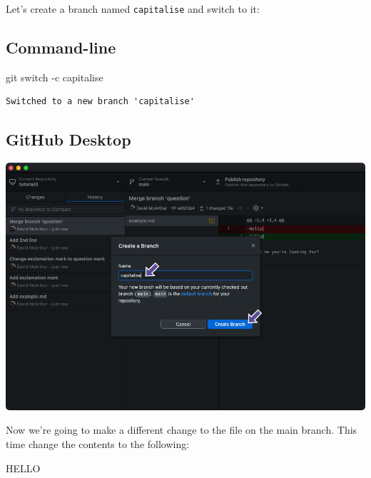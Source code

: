 \documentclass[
  letterpaper,
  DIV=11,
  numbers=noendperiod]{scrartcl}
\newenvironment{Shaded}{\begin{snugshade}}{\end{snugshade}}
\newcommand{\AttributeTok}[1]{\textcolor[rgb]{0.40,0.45,0.13}{#1}}
\newcommand{\FunctionTok}[1]{\textcolor[rgb]{0.28,0.35,0.67}{#1}}
\newcommand{\NormalTok}[1]{\textcolor[rgb]{0.00,0.23,0.31}{#1}}
\begin{document}
Let's create a branch named \texttt{capitalise} and switch to it:

\subsection{Command-line}

\begin{Shaded}
\begin{Highlighting}[]
\FunctionTok{git}\NormalTok{ switch }\AttributeTok{{-}c}\NormalTok{ capitalise}
\end{Highlighting}
\end{Shaded}

\begin{verbatim}
Switched to a new branch 'capitalise'
\end{verbatim}

\subsection{GitHub Desktop}

\includegraphics{images/image46_1.png}

Now we're going to make a different change to the file on the main
branch. This time change the contents to the following:

\begin{tcolorbox}[enhanced jigsaw, opacitybacktitle=0.6, arc=.35mm, toprule=.15mm, leftrule=.75mm, colbacktitle=quarto-callout-note-color!10!white, bottomrule=.15mm, rightrule=.15mm, opacityback=0, title=\textcolor{quarto-callout-note-color}{\faInfo}\hspace{0.5em}{example.md}, toptitle=1mm, breakable, left=2mm, colback=white, titlerule=0mm, bottomtitle=1mm, coltitle=black, colframe=quarto-callout-note-color-frame]

HELLO

\end{tcolorbox}
\end{document}

